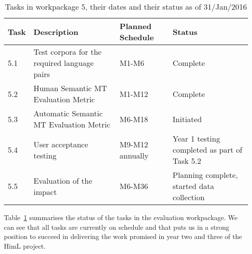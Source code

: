 \begin{table}[h!]
\begin{center}
      \begin{tabular}{|l|l|l|p{6.5cm}|}
      \hline
      
\bf{Task} & \bf{Description} & \bf{Planned Schedule}  & \bf{Status } \\
\hline                               
     5.1   & Test corpora for the required language pairs & M1-M6  & Complete  \\ 
     5.2   & Human Semantic MT Evaluation Metric &  M1-M12 & Complete \\ 
     5.3   & Automatic Semantic MT Evaluation Metric & M6-M18  &  Initiated \\ 
     5.4   & User acceptance testing &  M9-M12 annually  &  Year 1 testing completed as part of Task 5.2 \\ 
     5.5   & Evaluation of the impact &  M6-M36 & Planning complete, started data collection  \\ 
 
      \hline
    \end{tabular}
\end{center}
\normalsize
\vspace*{-3ex}
\caption{Tasks in workpackage 5, their dates and their status as of 31/Jan/2016
}
\label{tab:tasksschedule}
\end{table}

 Table~\ref{tab:tasksschedule} summarises the status of the tasks in the evaluation workpackage. 
We can see that all tasks are currently on schedule and that puts us in a strong position
to succeed in delivering the work promised in year two and three of the HimL project.
 